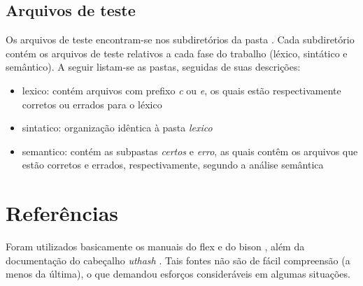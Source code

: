 \documentclass[
	article,			%
	11pt,				%
	oneside,			%
	a4paper,			%
	english,			%
	brazil,				%
	sumario=tradicional
	]{abntex2}
\renewcommand{\it}[1]{\textit{#1}}
\begin{document}
\subsection{Arquivos de teste}
Os arquivos de teste encontram-se nos subdiretórios da pasta \href{https://github.com/maffei2443/unb_tradutores/tree/new_master/trab4/test}{}. Cada subdiretório contém os arquivos de teste relativos a cada fase do trabalho (léxico, sintático e semântico). A seguir listam-se as pastas, seguidas de suas descrições:
\begin{itemize}
	\item lexico: contém arquivos com prefixo \it{c} ou \it{e}, os quais estão respectivamente corretos ou errados para o léxico
	\item sintatico: organização idêntica à pasta \it{lexico}
	\item semantico: contém as subpastas \it{certos} e \it{erro}, as quais contêm os arquivos que estão corretos e errados, respectivamente, segundo a análise semântica
\end{itemize}

\section{Referências}
Foram utilizados basicamente os manuais do flex \cite{flex} e do bison \cite{bison}, além da documentação do cabeçalho \it{uthash} \cite{uthash}. Tais fontes não são de fácil compreensão (a menos da última), o que demandou esforços consideráveis em algumas situações.
% 

\postextual


\end{document}
